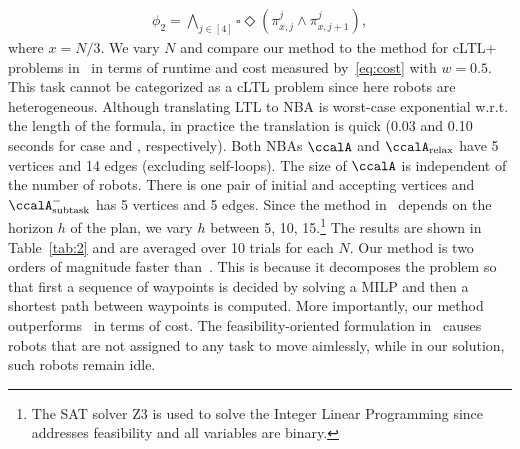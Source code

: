 \documentclass[journal]{IEEEtran}
\newcommand{\auto}[1]{\ccalA_{\text{#1}}}
\renewcommand{\ap}[3]{\mathcal{\pi}_{{#1},{#2}}^{#3}}
\newcommand{\RNum}[1]{\uppercase\expandafter{\romannumeral #1\relax}}
\begin{document}
\small
\begin{align*}
   \phi_2 = \bigwedge\nolimits_{j\in[4]} \square \Diamond( \ap{x}{j}{j} \wedge \ap{x}{j+1}{j} ) ,
\end{align*}
\normalsize
where $x \!\!=\!\! N/3$. We vary $N$ and compare our method to the method for cLTL+ problems in~\cite{sahin2019multirobot} in terms of runtime and cost measured by~\eqref{eq:cost} with $w=0.5$. This task cannot be categorized as a cLTL problem since here robots are heterogeneous. {Although translating LTL to NBA is worst-case exponential w.r.t. the length of the formula, in practice the translation is quick (0.03 and 0.10 seconds for case \RNum{1} and \RNum{2}, respectively). Both NBAs $\ccalA$ and $\auto{relax}$ have 5 vertices and 14 edges (excluding self-loops). The size of $\ccalA$ is independent of the number of robots. There is one pair of initial and accepting vertices and  $\auto{subtask}^-$ has 5 vertices and 5 edges.} Since the method in~\cite{sahin2019multirobot} depends on the horizon $h$ of the plan, we vary $h$ between 5, 10, 15.\footnote{The SAT solver Z3 is used to solve the Integer Linear Programming since~\cite{sahin2019multirobot} addresses feasibility and all variables are binary.} The results  are shown in Table~\ref{tab:2} and are averaged over 10 trials for each $N$. Our method is two orders of magnitude faster than~\cite{sahin2019multirobot}. This is because it decomposes the problem so that first a sequence of waypoints is decided by solving a MILP and then a shortest path  between waypoints is computed. More importantly, our method outperforms~\cite{sahin2019multirobot} in terms of cost.  The feasibility-oriented formulation in~\cite{sahin2019multirobot} causes robots that are not assigned to any task to move aimlessly, while in our solution, such robots remain idle.
\end{document}
